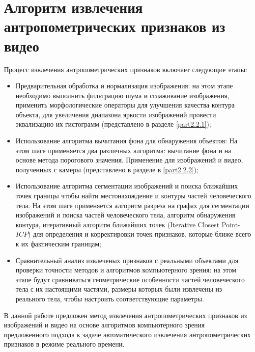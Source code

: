 \section{Алгоритм извлечения антропометрических признаков из видео}

Процесс извлечения антропометрических признаков включает следующие этапы:

\begin{itemize}
	\item Предварительная обработка и нормализация изображения: на этом этапе необходимо выполнить фильтрацию шума и сглаживание изображения, применить морфологические операторы для улучшения качества контура объекта, для увеличения диапазона яркости изображений провести эквализацию их гистограмм (представлено в разделе \ref{part2.2.1});
	\item Использование алгоритма вычитания фона для обнаружения объектов: На этом шаге применяется два различных алгоритма: вычитание фона и на основе метода порогового значения. Применение для изображений и видео, полученных с камеры (представлено в разделе в \ref{part2.2.2});
	\item Использование алгоритма сегментации изображений и поиска ближайших точек границы чтобы найти местонахождение и контуры частей человеческого тела. На этом шаге применяется алгоритм разреза на графах для сегментации изображений и поиска частей человеческого тела, алгоритм обнаружения контура, итеративный алгоритм ближайших точек (Iterative Closest Point-$ICP$) для определения и корректировки точек признаков, которые ближе всего к их фактическим границам;
	\item Сравнительный анализ извлеченых признаков с реальными объектами для проверки точности методов и алгоритмов компьютерного зрения: на этом этапе будут сравниваться геометрические особенности частей человеческого тела с их настоящими частями, размеры которых были извлечены из реального тела, чтобы настроить соответствующие параметры.
\end{itemize}

В данной работе предложен метод извлечения антропометрических признаков из изображений и видео на основе алгоритмов компьютерного зрения предложенного подхода к задаче автоматического извлечения антропометрических признаков в режиме реального времени.







